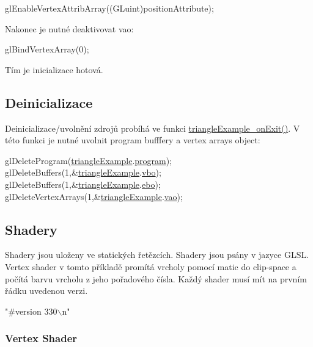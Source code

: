\begin{DoxyCodeInclude}
  glEnableVertexAttribArray((GLuint)positionAttribute);
\end{DoxyCodeInclude}
Nakonec je nutné deaktivovat vao\-: 
\begin{DoxyCodeInclude}
  glBindVertexArray(0);
\end{DoxyCodeInclude}
Tím je inicializace hotová. \hypertarget{triangleExample.c_Deinit}{}\subsection{Deinicializace}\label{triangleExample.c_Deinit}
Deinicializace/uvolnění zdrojů probíhá ve funkci \hyperlink{triangleExample_8c_a35b10f59fe16423447777ba6bbba3b66}{triangle\-Example\-\_\-on\-Exit()}. V této funkci je nutné uvolnit program bufffery a vertex arrays object\-: 
\begin{DoxyCodeInclude}
  glDeleteProgram(\hyperlink{triangleExample_8c_af82b723635ac0c90962571915a1b1163}{triangleExample}.\hyperlink{structTriangleExampleVariables_abc287e489a25d4e3c4ad1899d183881d}{program});
  glDeleteBuffers(1,&\hyperlink{triangleExample_8c_af82b723635ac0c90962571915a1b1163}{triangleExample}.\hyperlink{structTriangleExampleVariables_af3b747228ed4a26fffca56a69838ecae}{vbo});
  glDeleteBuffers(1,&\hyperlink{triangleExample_8c_af82b723635ac0c90962571915a1b1163}{triangleExample}.\hyperlink{structTriangleExampleVariables_a9e7c6acc784faacf21bca7c46f9f4244}{ebo});
  glDeleteVertexArrays(1,&\hyperlink{triangleExample_8c_af82b723635ac0c90962571915a1b1163}{triangleExample}.\hyperlink{structTriangleExampleVariables_a4230de13079947c4093b8d75ad1d5035}{vao});
\end{DoxyCodeInclude}
\hypertarget{triangleExample.c_Shaders}{}\subsection{Shadery}\label{triangleExample.c_Shaders}
Shadery jsou uloženy ve statických řetězcích. Shadery jsou psány v jazyce G\-L\-S\-L. Vertex shader v tomto příkladě promítá vrcholy pomocí matic do clip-\/space a počítá barvu vrcholu z jeho pořadového čísla. Každý shader musí mít na prvním řádku uvedenou verzi. 
\begin{DoxyCodeInclude}
\textcolor{stringliteral}{"#version 330\(\backslash\)n"}
\end{DoxyCodeInclude}
\hypertarget{triangleExample.c_VertexShader}{}\subsubsection{Vertex Shader}\label{triangleExample.c_VertexShader}
